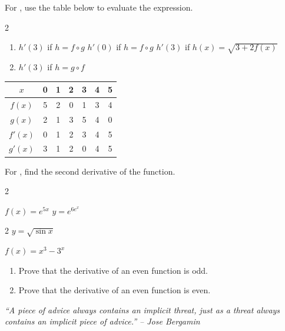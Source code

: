 \documentclass{book}
\begin{document}
For , use the table below to evaluate the expression.
\begin{multicols}{2}
\begin{enumerate}[!HW!]
\item \label{exer:chaintable:start} $h'(3)$ if $h=f\circ g$ 
\itemspade$h'(0)$ if $h=f\circ g$ 
\itemspade $h'(3)$ if $h(x)=\sqrt{3+2f(x)}$
\item\label{exer:chaintable:stop} $h'(3)$ if $h=g\circ f$ 
\end{enumerate}

\begin{center}
\begin{tabular}{c||c|c|c|c|c|c}
$x$ & 0 & 1 & 2 & 3 & 4 & 5\\\hline\hline
$f(x)$ & 5 & 2& 0& 1& 3& 4\\\hline
$g(x)$ & 2 & 1& 3& 5& 4& 0\\\hline
$f'(x)$ & 0 & 1& 2& 3& 4& 5\\\hline
$g'(x)$ & 3 & 1 & 2& 0& 4& 5
\end{tabular}
\end{center}
\end{multicols}

For , find the second derivative of the function.
\begin{enumerate}[!HW!]
\begin{multicols}{2}
\item \label{exer:secondchain:start} $f(x) = e^{5x}$ 
\itemspade $y=e^{6e^x}$ 
\end{multicols}
\begin{multicols}{2}
\itemspade $y=\sqrt{\sin x}$ 
\item \label{exer:secondchain:stop}  $f(x) = x^3-3^x$ 
\end{multicols}
\end{enumerate}


\begin{enumerate}[!HW!]
\item Prove that the derivative of an even function is odd. 
\item Prove that the derivative of an even function is even. 
\end{enumerate}
\pagebreak
\begin{center} 
\emph{``A piece of advice always contains an implicit threat, just as a threat always contains an implicit piece of advice.'' -- Jose Bergamin}
\end{center}
\end{document}
